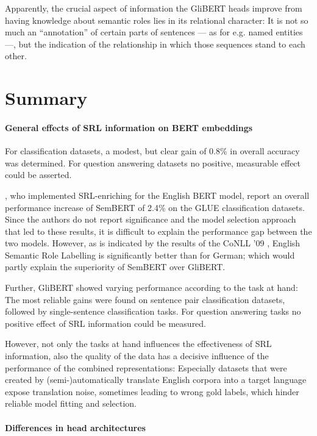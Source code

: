 {Apparently, the crucial aspect of information the GliBERT heads improve from having knowledge
about semantic roles lies in its relational character: It is not so much an ``annotation''
of certain parts of sentences --- as for e.g. named entities ---, but the indication of the
relationship in which those sequences stand to each other.

\section{Summary}

\paragraph*{General effects of SRL information on BERT embeddings}

For classification datasets, a modest, but clear gain of 0.8\% in overall accuracy
was determined. For question answering datasets no positive, measurable effect
could be asserted.

\cite{zhang2019semantics}, who implemented SRL-enriching for the English BERT model, report
an overall performance increase of SemBERT of 2.4\% on the GLUE classification datasets.
Since the authors do not report
significance and the model selection approach that led to these results, it is difficult to
explain the performance gap between the two models. However, as is indicated by the results
of the CoNLL '09 \citep{hajivc2009conll} , English Semantic Role Labelling is significantly
better than for German; which would partly explain the superiority of SemBERT over GliBERT.

Further, GliBERT showed varying performance according to the task at hand: The most reliable
gains were found on sentence pair classification datasets, followed
by single-sentence classification tasks. For question answering tasks no positive
effect of SRL information could be measured.

However, not only the tasks at hand influences the effectiveness of SRL information,
also the quality of the data has a decisive influence of the performance of the
combined representations: Especially datasets that were created by (semi-)automatically
translate English corpora into a target language expose translation noise, sometimes
leading to wrong gold labels, which hinder reliable model fitting and selection.


\paragraph*{Differences in head architectures}

}
